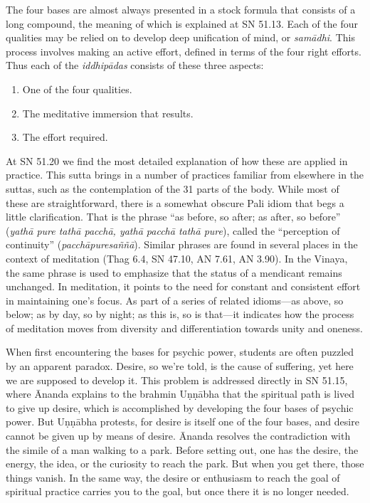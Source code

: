 \documentclass[12pt,openany]{book}%
\begin{document}
The four bases are almost always presented in a stock formula that consists of a long compound, the meaning of which is explained at SN 51.13. Each of the four qualities may be relied on to develop deep unification of mind, or \textit{\textsanskrit{samādhi}}. This process involves making an active effort, defined in terms of the four right efforts. Thus each of the \textit{\textsanskrit{iddhipādas}} consists of these three aspects:

\begin{enumerate}%
\item One of the four qualities.%
\item The meditative immersion that results.%
\item The effort required.%
\end{enumerate}

At SN 51.20 we find the most detailed explanation of how these are applied in practice. This sutta brings in a number of practices familiar from elsewhere in the suttas, such as the contemplation of the 31 parts of the body. While most of these are straightforward, there is a somewhat obscure Pali idiom that begs a little clarification. That is the phrase “as before, so after; as after, so before” (\textit{\textsanskrit{yathā} pure \textsanskrit{tathā} \textsanskrit{pacchā}, \textsanskrit{yathā} \textsanskrit{pacchā} \textsanskrit{tathā} pure}), called the “perception of continuity” (\textit{\textsanskrit{pacchāpuresaññā}}). Similar phrases are found in several places in the context of meditation (Thag 6.4, SN 47.10, AN 7.61, AN 3.90). In the Vinaya, the same phrase is used to emphasize that the status of a mendicant remains unchanged. In meditation, it points to the need for constant and consistent effort in maintaining one’s focus. As part of a series of related idioms—as above, so below; as by day, so by night; as this is, so is that—it indicates how the process of meditation moves from diversity and differentiation towards unity and oneness.

When first encountering the bases for psychic power, students are often puzzled by an apparent paradox. Desire, so we’re told, is the cause of suffering, yet here we are supposed to develop it. This problem is addressed directly in SN 51.15, where Ānanda explains to the brahmin \textsanskrit{Uṇṇābha} that the spiritual path is lived to give up desire, which is accomplished by developing the four bases of psychic power. But \textsanskrit{Uṇṇābha} protests, for desire is itself one of the four bases, and desire cannot be given up by means of desire. Ānanda resolves the contradiction with the simile of a man walking to a park. Before setting out, one has the desire, the energy, the idea, or the curiosity to reach the park. But when you get there, those things vanish. In the same way, the desire or enthusiasm to reach the goal of spiritual practice carries you to the goal, but once there it is no longer needed.
\end{document}
